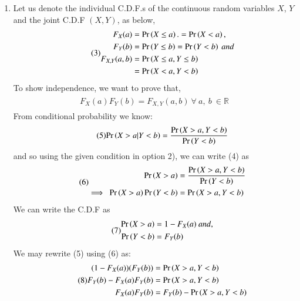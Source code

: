 \documentclass[journal,12pt,twocolumn]{IEEEtran}
\begin{document}
\begin{enumerate}
    \item Let us denote the individual C.D.F.s of the continuous random variables $X$, $Y$ and the joint C.D.F $(X, Y)$, as below,\\
\begin{align}\tag{3}
    \begin{split}
        F_X(a) &= \Pr\left(X \leq a\right) .= \Pr\left(X < a\right),\\
        F_Y(b) &= \Pr\left(Y \leq b\right) = \Pr\left(Y < b\right)\ and \\
        F_{X,Y}(a,b) &= \Pr\left(X \leq a, Y \leq b\right)\\
                     &= \Pr\left(X < a, Y < b\right)
    \end{split}
\end{align}
To show independence, we want to prove that,
\begin{align}\tag{4}
    \begin{split}
        F_X(a)F_Y(b) = F_{X, Y}(a,b)\ \forall\ a,\ b\ \in \mathbb{R}
    \end{split}
\end{align}
From conditional probability we know: 
\begin{align}\tag{5}
    \begin{split}
        \Pr\left(X > a | Y < b\right) = \frac{\Pr\left(X > a, Y < b\right)}{\Pr\left(Y < b\right)}
    \end{split}
\end{align}
and so using the given condition in option 2), we can write (4) as
\begin{align}\tag{6}
    \begin{split}
        \Pr\left(X > a\right) &= \frac{\Pr\left(X > a, Y < b\right)}{\Pr\left(Y < b\right)}\\
        \implies\ \Pr\left(X > a\right)\Pr\left(Y < b\right) &= \Pr\left(X > a, Y < b\right)
    \end{split}
\end{align}
We can write the C.D.F as 
\begin{align}\tag{7}
    \begin{split}
        \Pr\left(X > a\right) &= 1 - F_X(a)\ and,\\
        \Pr\left(Y < b\right) &= F_Y(b)
    \end{split}
\end{align}
We may rewrite (5) using (6) as:
\begin{align}\tag{8}
    \begin{split}
        (1 - F_X(a))(F_Y(b)) &= \pr{X > a, Y < b}\\
        F_Y(b) - F_X(a)F_Y(b) &= \pr{X > a, Y < b}\\
        F_X(a)F_Y(b) &= F_Y(b) - \pr{X > a, Y < b}

\end{split}
\end{align}
\end{enumerate}
\end{document}
